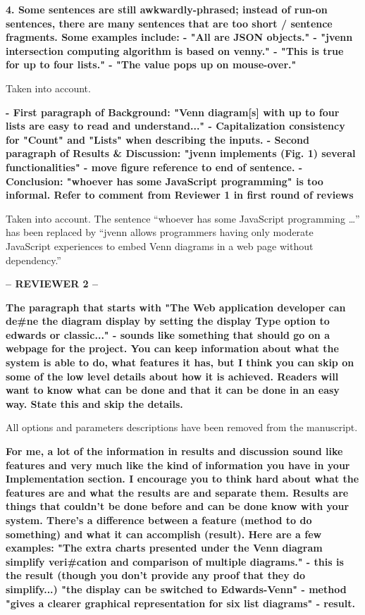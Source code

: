 \documentclass[10pt,stdletter,dateno,sigleft]{newlfm} %
\begin{document}
\begin{newlfm}
\textbf{4. Some sentences are still awkwardly-phrased; instead of run-on
sentences, there are many sentences that are too short / sentence
fragments. Some examples include:\newline
- "All are JSON objects."\newline
- "jvenn intersection computing algorithm is based on venny."\newline
- "This is true for up to four lists."\newline
- "The value pops up on mouse-over."}

Taken into account.


\textbf{- First paragraph of Background: "Venn diagram[s] with up to four lists
are easy to read and understand..."\newline
- Capitalization consistency for "Count" and "Lists" when describing
the inputs.\newline
- Second paragraph of Results & Discussion: "jvenn implements (Fig. 1)
several functionalities" - move figure reference to end of sentence.\newline
- Conclusion: "whoever has some JavaScript programming" is too
informal. Refer to comment from Reviewer 1 in first round of reviews\newline}

Taken into account. The sentence ``whoever has some JavaScript programming \ldots''
has been replaced by ``jvenn allows programmers having only moderate JavaScript
experiences to embed Venn diagrams in a web page without dependency.''


\textbf{-- REVIEWER 2 --}

\textbf{The paragraph that starts with "The Web application developer can de#ne
the diagram display by setting the display Type option to edwards or classic..." -
sounds like something that should go on a webpage for the project. You can
keep information about what the system is able to do, what features it has, but I
think you can skip on some of the low level details about how it is achieved.
Readers will want to know what can be done and that it can be done
in an easy way. State this and skip the details.}

All options and parameters descriptions have been removed from the manuscript.


\textbf{For me, a lot of the information in results and discussion sound like
features and very much like the kind of information you have in your Implementation section. I
encourage you to think hard about what the features are and what the results are
and separate them. Results are things that couldn't be done before and can be
done know with your system. There's a difference between
a feature (method to do something) and what it can accomplish (result). Here are
a few examples:
"The extra charts presented under the Venn diagram simplify veri#cation and
comparison of multiple diagrams." - this is the result (though you don't provide
any proof that they do simplify...)
"the display can be switched to Edwards-Venn" - method
"gives a clearer graphical representation for six list diagrams" - result.}


\end{newlfm}
\end{document}
